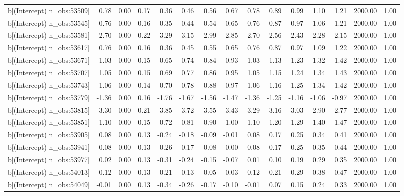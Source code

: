 \begin{table}[ht]
\begin{tabular}{rrrrrrrrrrrrrrr}
  b[(Intercept) n\_obs:53509] & 0.78 & 0.00 & 0.17 & 0.36 & 0.46 & 0.56 & 0.67 & 0.78 & 0.89 & 0.99 & 1.10 & 1.21 & 2000.00 & 1.00 \\ 
  b[(Intercept) n\_obs:53545] & 0.76 & 0.00 & 0.16 & 0.35 & 0.44 & 0.54 & 0.65 & 0.76 & 0.87 & 0.97 & 1.06 & 1.21 & 2000.00 & 1.00 \\ 
  b[(Intercept) n\_obs:53581] & -2.70 & 0.00 & 0.22 & -3.29 & -3.15 & -2.99 & -2.85 & -2.70 & -2.56 & -2.43 & -2.28 & -2.15 & 2000.00 & 1.00 \\ 
  b[(Intercept) n\_obs:53617] & 0.76 & 0.00 & 0.16 & 0.36 & 0.45 & 0.55 & 0.65 & 0.76 & 0.87 & 0.97 & 1.09 & 1.22 & 2000.00 & 1.00 \\ 
  b[(Intercept) n\_obs:53671] & 1.03 & 0.00 & 0.15 & 0.65 & 0.74 & 0.84 & 0.93 & 1.03 & 1.13 & 1.23 & 1.32 & 1.42 & 2000.00 & 1.00 \\ 
  b[(Intercept) n\_obs:53707] & 1.05 & 0.00 & 0.15 & 0.69 & 0.77 & 0.86 & 0.95 & 1.05 & 1.15 & 1.24 & 1.34 & 1.43 & 2000.00 & 1.00 \\ 
  b[(Intercept) n\_obs:53743] & 1.06 & 0.00 & 0.14 & 0.70 & 0.78 & 0.88 & 0.97 & 1.06 & 1.16 & 1.25 & 1.34 & 1.42 & 2000.00 & 1.00 \\ 
  b[(Intercept) n\_obs:53779] & -1.36 & 0.00 & 0.16 & -1.76 & -1.67 & -1.56 & -1.47 & -1.36 & -1.25 & -1.16 & -1.06 & -0.97 & 2000.00 & 1.00 \\ 
  b[(Intercept) n\_obs:53815] & -3.30 & 0.00 & 0.21 & -3.85 & -3.72 & -3.55 & -3.43 & -3.29 & -3.16 & -3.03 & -2.90 & -2.77 & 2000.00 & 1.00 \\ 
  b[(Intercept) n\_obs:53851] & 1.10 & 0.00 & 0.15 & 0.72 & 0.81 & 0.90 & 1.00 & 1.10 & 1.20 & 1.29 & 1.40 & 1.47 & 2000.00 & 1.00 \\ 
  b[(Intercept) n\_obs:53905] & 0.08 & 0.00 & 0.13 & -0.24 & -0.18 & -0.09 & -0.01 & 0.08 & 0.17 & 0.25 & 0.34 & 0.41 & 2000.00 & 1.00 \\ 
  b[(Intercept) n\_obs:53941] & 0.08 & 0.00 & 0.13 & -0.26 & -0.17 & -0.08 & -0.00 & 0.08 & 0.17 & 0.25 & 0.35 & 0.44 & 2000.00 & 1.00 \\ 
  b[(Intercept) n\_obs:53977] & 0.02 & 0.00 & 0.13 & -0.31 & -0.24 & -0.15 & -0.07 & 0.01 & 0.10 & 0.19 & 0.29 & 0.35 & 2000.00 & 1.00 \\ 
  b[(Intercept) n\_obs:54013] & 0.12 & 0.00 & 0.13 & -0.21 & -0.13 & -0.05 & 0.03 & 0.12 & 0.21 & 0.29 & 0.38 & 0.47 & 2000.00 & 1.00 \\ 
  b[(Intercept) n\_obs:54049] & -0.01 & 0.00 & 0.13 & -0.34 & -0.26 & -0.17 & -0.10 & -0.01 & 0.07 & 0.15 & 0.24 & 0.33 & 2000.00 & 1.00 \\ 

\end{tabular}
\end{table}
